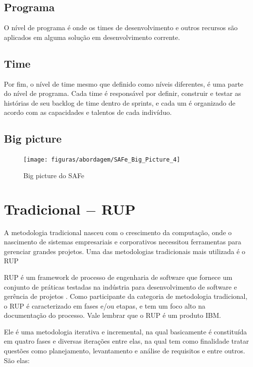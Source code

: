 \subsection{Programa}

  O nível de programa é onde os times de desenvolvimento e outros recursos são aplicados em alguma solução em desenvolvimento corrente.

\subsection{Time}

  Por fim, o nível de time mesmo que definido como níveis diferentes, é uma parte do nível de programa. Cada time é responsável por
  definir, construir e testar as histórias de seu backlog de time dentro de sprints, e cada um é organizado de acordo com as capacidades
  e talentos de cada indivíduo.

\subsection{Big picture}

  \begin{figure}[!htpb]
	  \centering
	  \texttt{[image: figuras/abordagem/SAFe\_Big\_Picture\_4]}
	  \caption{Big picture do SAFe}
  \end{figure}

\section{Tradicional $-$ RUP}

  A metodologia tradicional nasceu com o crescimento da computação, onde o nascimento de sistemas empresariais e corporativos necessitou
  ferramentas para gerenciar grandes projetos. Uma das metodologias tradicionais mais utilizada é o RUP

  RUP é um framework de processo de engenharia de software que fornece um conjunto de práticas testadas na indústria para desenvolvimento
  de software e gerência de projetos \cite{RUP}. Como participante da categoria de metodologia tradicional, o RUP é caracterizado em
  fases e/ou etapas, e tem um foco alto na documentação do processo. Vale lembrar que o RUP é um produto IBM.

  Ele é uma metodologia iterativa e incremental, na qual basicamente é constituída em quatro fases e diversas iterações entre elas, na qual tem como
  finalidade tratar questões como planejamento, levantamento e análise de requisitos e entre outros. São elas:

